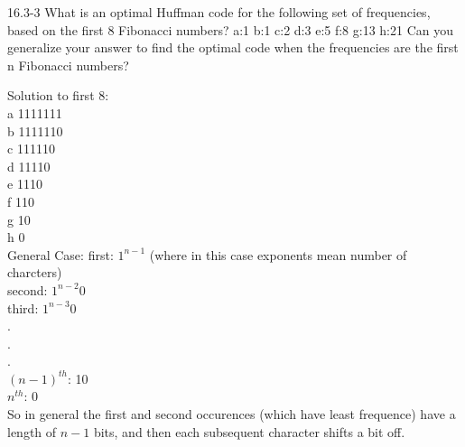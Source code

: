 \newpage \begin{problem}{16.3-3}
  What is an optimal Huffman code for the following set of frequencies, based on the first 8 Fibonacci numbers?
  \br
  a:1 b:1 c:2 d:3 e:5 f:8 g:13 h:21
  \br
  Can you generalize your answer to find the optimal code when the frequencies are the first n Fibonacci numbers?
  \begin{solution}
    Solution to first 8: \\
    a 1111111 \\
    b 1111110 \\
    c 111110 \\
    d 11110 \\
    e 1110 \\
    f 110 \\
    g 10 \\
    h 0\\
    General Case:
    \br
    first: $1^{n-1}$ (where in this case exponents mean number of charcters) \\
    second: $1^{n-2}0$ \\
    third: $1^{n-3}0$ \\
    . \\
    . \\
    . \\
    $(n-1)^{th}$: 10 \\
    $n^{th}$: 0 \\
    So in general the first and second occurences (which have least frequence) have a length of $n-1$ bits, and then each subsequent character shifts a bit off.
  \end{solution}
\end{problem}



